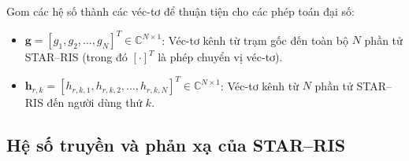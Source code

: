 Gom các hệ số thành các véc-tơ để thuận tiện cho các phép toán đại số:
\begin{itemize}
\item $\mathbf{g} = [g_1, g_2, \dots, g_N]^T \in \mathbb{C}^{N \times 1}$: Véc-tơ kênh từ trạm gốc đến toàn
  bộ $N$ phần tử STAR--RIS (trong đó $[\cdot]^T$ là phép chuyển vị véc-tơ).
\item $\mathbf{h}_{r,k} = [h_{r,k,1}, h_{r,k,2}, \dots, h_{r,k,N}]^T \in \mathbb{C}^{N \times 1}$: Véc-tơ
  kênh từ $N$ phần tử STAR--RIS đến người dùng thứ $k$.
\end{itemize}

\subsection{Hệ số truyền và phản xạ của STAR--RIS}
\label{ssec:he-so-star}

